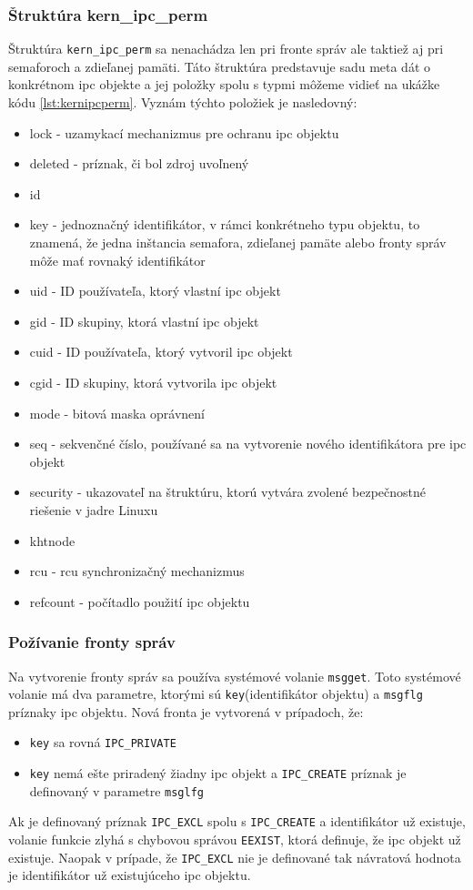 \subsubsection{Štruktúra kern\_ipc\_perm} \label{kernipcperm}
Štruktúra \texttt{kern\_ipc\_perm} sa nenachádza len pri fronte správ ale taktiež aj pri semaforoch a zdieľanej pamäti. Táto štruktúra predstavuje sadu meta dát o konkrétnom \acrshort{ipc} objekte a jej položky spolu s typmi môžeme vidieť na ukážke kódu \ref{lst:kernipcperm}. Vyznám týchto položiek je nasledovný:
\begin{itemize}
\item lock - uzamykací mechanizmus pre ochranu \acrshort{ipc} objektu
\item deleted - príznak, či bol zdroj uvoľnený
\item id
\item key - jednoznačný identifikátor, v rámci konkrétneho typu objektu, to znamená, že jedna inštancia semafora, zdieľanej pamäte alebo fronty správ môže mať rovnaký identifikátor
\item uid - ID používateľa, ktorý vlastní \acrshort{ipc} objekt
\item gid - ID skupiny, ktorá vlastní \acrshort{ipc} objekt
\item cuid - ID používateľa, ktorý vytvoril \acrshort{ipc} objekt
\item cgid - ID skupiny, ktorá vytvorila \acrshort{ipc} objekt
\item mode - bitová maska oprávnení
\item seq - sekvenčné číslo, používané sa na vytvorenie nového identifikátora pre \acrshort{ipc} objekt
\item security - ukazovateľ na štruktúru, ktorú vytvára zvolené bezpečnostné riešenie v jadre Linuxu
\item khtnode
\item rcu - \acrshort{rcu} synchronizačný mechanizmus
\item refcount - počítadlo použití \acrshort{ipc} objektu
\end{itemize}
\subsubsection{Požívanie fronty správ} \label{msguse}
Na vytvorenie fronty správ sa používa systémové volanie \texttt{msgget}. Toto systémové volanie má dva parametre, ktorými sú \texttt{key}(identifikátor objektu) a \texttt{msgflg} príznaky \acrshort{ipc} objektu. Nová fronta je vytvorená v prípadoch, že:
\begin{itemize}
\item \texttt{key} sa rovná \texttt{IPC\_PRIVATE}
\item \texttt{key} nemá ešte priradený žiadny \acrshort{ipc} objekt a \texttt{IPC\_CREATE} príznak je definovaný v parametre \texttt{msglfg}
\end{itemize}
Ak je definovaný príznak \texttt{IPC\_EXCL} spolu s \texttt{IPC\_CREATE} a identifikátor už existuje, volanie funkcie zlyhá s chybovou správou \texttt{EEXIST}, ktorá definuje, že \acrshort{ipc} objekt už existuje. Naopak v prípade, že \texttt{IPC\_EXCL} nie je definované tak návratová hodnota je identifikátor už existujúceho \acrshort{ipc} objektu.\cite{msgget}

